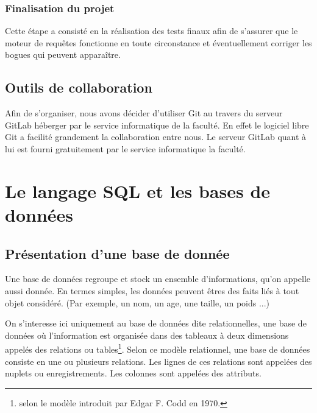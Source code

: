 \documentclass[oneside,13pt,a4paper]{report}
\begin{document}
\subsection{Finalisation du projet}

Cette étape a consisté en la réalisation des tests finaux afin de s’assurer que le moteur de requêtes fonctionne en toute circonstance et éventuellement corriger les bogues qui peuvent apparaître.

\section{Outils de collaboration}

Afin de s’organiser, nous avons décider d’utiliser Git au travers du serveur GitLab héberger par le service informatique de la faculté. En effet le logiciel libre Git a facilité grandement la collaboration entre nous. Le serveur GitLab quant à lui est fourni gratuitement par le service informatique la faculté.


\chapter{Le langage SQL et les bases de données}


\section{Présentation d’une base de donnée}

Une base de données regroupe et stock un ensemble d’informations, qu'on appelle aussi donnée.
En termes simples, les données peuvent êtres des faits liés à tout objet considéré.
(Par exemple, un nom, un age, une taille, un poids ...)

On s'interesse ici uniquement au base de données dite relationnelles, une base de données où l'information est organisée dans des tableaux à deux dimensions appelés des relations ou tables\footnote{ selon le modèle introduit par Edgar F. Codd en 1970.}.
Selon ce modèle relationnel, une base de données consiste en une ou plusieurs relations. Les lignes de ces relations sont appelées des nuplets ou enregistrements. Les colonnes sont appelées des attributs.
\end{document}
